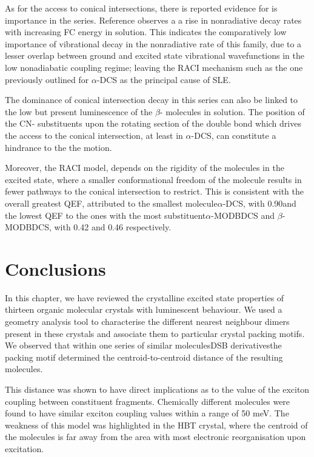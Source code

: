 As for the access to conical intersections, there is reported evidence for is importance in the series. Reference  observes a a rise in nonradiative decay rates with increasing FC energy in solution. This indicates the comparatively low importance of vibrational decay in the nonradiative rate of this family, due to a lesser overlap between ground and excited state vibrational wavefunctions in the low nonadiabatic coupling regime; leaving the RACI mechanism such as the one previously outlined for $\alpha$-DCS as the principal cause of SLE.\cite{Escudero2019}


The dominance of conical intersection decay in this series can also be linked to the low but present luminescence of the $\beta$- molecules in solution. The position of the CN- substituents upon the rotating section of the double bond which drives the access to the conical intersection, at least in $\alpha$-DCS, can constitute a hindrance to the the motion.

Moreover, the RACI model, depends on the rigidity of the molecules in the excited state, where a smaller conformational freedom of the molecule results in fewer pathways to the conical intersection to restrict. This is consistent with the overall greatest QEF, attributed to the smallest molecule\textemdash{}$\alpha$-DCS, with 0.90\textemdash{}and the lowest QEF to the ones with the most substituent\textemdash{}$\alpha$-MODBDCS and $\beta$-MODBDCS, with 0.42 and 0.46 respectively.



\section{Conclusions}

In this chapter, we have reviewed the crystalline excited state properties of thirteen organic molecular crystals with luminescent behaviour. We used a geometry analysis tool to characterise the different nearest neighbour dimers present in these crystals and associate them to particular crystal packing motifs. We observed that within one series of similar molecules\textendash{}DSB derivatives\textendash{}the packing motif determined the centroid-to-centroid distance of the resulting molecules.

This distance was shown to have direct implications as to the value of the exciton coupling between constituent fragments. Chemically different molecules were found to have similar exciton coupling values within a range of 50 meV. The weakness of this model was highlighted in the HBT crystal, where the centroid of the molecules is far away from the area with most electronic reorganisation upon excitation.

